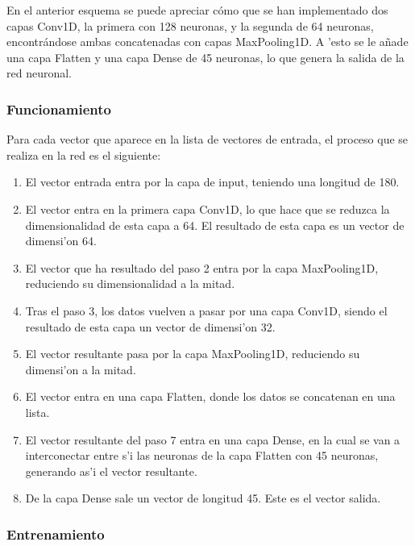 
En el anterior esquema se puede apreciar cómo que se han implementado dos capas Conv1D, la primera con 128 neuronas, y la segunda de 64 neuronas, encontrándose ambas concatenadas con capas MaxPooling1D. A 'esto se le añade una capa Flatten y una capa Dense de 45 neuronas, lo que genera la salida de la red neuronal.

\clearpage

\subsubsection*{Funcionamiento}

Para cada vector que aparece en la lista de vectores de entrada, el proceso que se realiza en la red es el siguiente:

\begin{enumerate}
\item El vector entrada entra por la capa de input, teniendo una longitud de 180.
\item El vector entra en la primera capa Conv1D, lo que hace que se reduzca  la dimensionalidad de esta capa a 64. El resultado de esta capa es un vector de dimensi'on 64. 
\item El vector que ha resultado del paso 2 entra por la capa MaxPooling1D, reduciendo su dimensionalidad a la mitad. 
\item Tras el paso 3, los datos vuelven a pasar por una capa Conv1D, siendo el resultado de esta capa un vector de dimensi'on 32.
\item El vector resultante pasa por la capa MaxPooling1D, reduciendo su dimensi'on a la mitad.
\item El vector entra en una capa Flatten, donde los datos se concatenan en una lista. 
\item El vector resultante del paso 7 entra en una capa Dense, en la cual se van a interconectar entre s'i las neuronas de la capa Flatten con 45 neuronas, generando as'i el vector resultante.
\item De la capa Dense sale un vector de longitud 45. Este es el vector salida.
\end{enumerate}





\subsubsection*{Entrenamiento}

